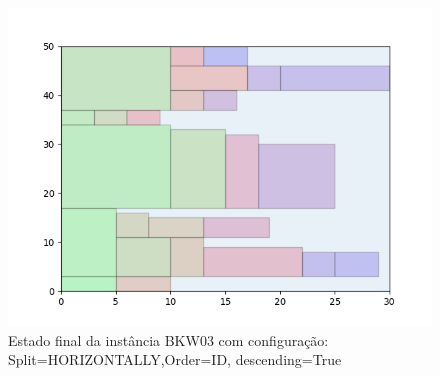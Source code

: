 \begin{figure}[H]
    \centering
    \caption[]{Estado final da instância BKW03 com configuração: Split=HORIZONTALLY,Order=ID, descending=True}
    \label{fig:bkw03-horizontally-id-true}
    \includegraphics[scale=0.5]{output/figures/bkw/bkw03/horizontally/id/true/00}
\end{figure}
